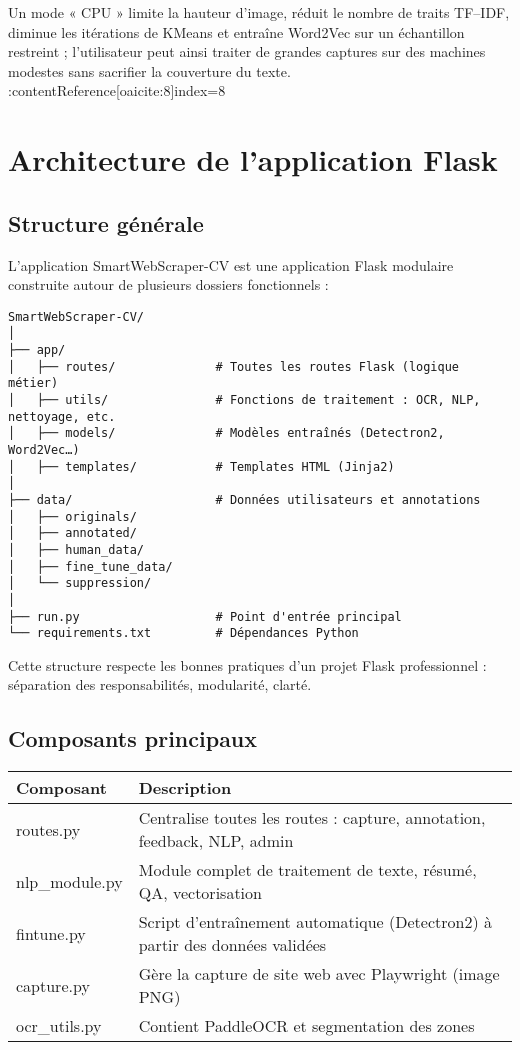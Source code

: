 \documentclass[12pt,a4paper]{report}
\begin{document}
Un mode « CPU » limite la hauteur d’image, réduit le nombre de traits TF–IDF, diminue les itérations de KMeans et entraîne Word2Vec sur un échantillon restreint ; l’utilisateur peut ainsi traiter de grandes captures sur des machines modestes sans sacrifier la couverture du texte. :contentReference[oaicite:8]{index=8}



\chapter{ Architecture de l'application Flask}

\section{Structure générale}

L'application SmartWebScraper-CV est une application Flask modulaire construite autour de plusieurs dossiers fonctionnels :

\begin{lstlisting}
SmartWebScraper-CV/
│
├── app/
│   ├── routes/              # Toutes les routes Flask (logique métier)
│   ├── utils/               # Fonctions de traitement : OCR, NLP, nettoyage, etc.
│   ├── models/              # Modèles entraînés (Detectron2, Word2Vec…)
│   ├── templates/           # Templates HTML (Jinja2)
│
├── data/                    # Données utilisateurs et annotations
│   ├── originals/
│   ├── annotated/
│   ├── human_data/
│   ├── fine_tune_data/
│   └── suppression/
│
├── run.py                   # Point d'entrée principal
└── requirements.txt         # Dépendances Python
\end{lstlisting}

Cette structure respecte les bonnes pratiques d'un projet Flask professionnel : séparation des responsabilités, modularité, clarté.

\section{Composants principaux}

\begin{longtable}{|p{3cm}|p{10cm}|}
\hline
\textbf{Composant} & \textbf{Description} \\
\hline
routes.py & Centralise toutes les routes : capture, annotation, feedback, NLP, admin \\
\hline
nlp\_module.py & Module complet de traitement de texte, résumé, QA, vectorisation \\
\hline
fintune.py & Script d'entraînement automatique (Detectron2) à partir des données validées \\
\hline
capture.py & Gère la capture de site web avec Playwright (image PNG) \\
\hline
ocr\_utils.py & Contient PaddleOCR et segmentation des zones \\
\hline
\end{longtable}
\end{document}
